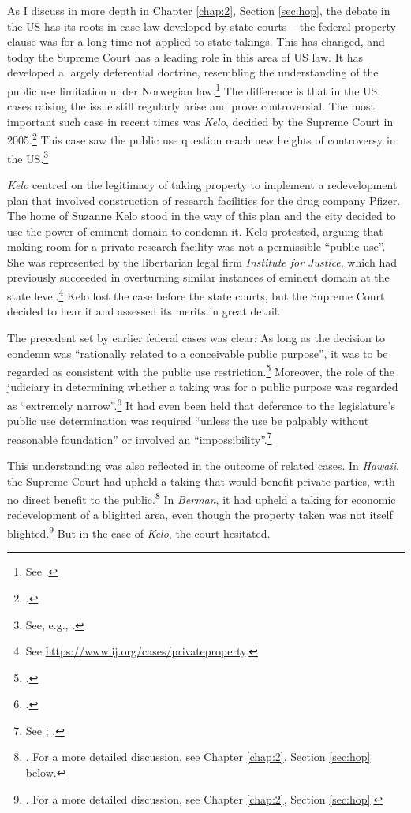 As I discuss in more depth in Chapter \ref{chap:2}, Section \ref{sec:hop}, the debate in the US has its roots in case law developed by state courts -- the federal property clause was for a long time not applied to state takings. This has changed, and today the Supreme Court has a leading role in this area of US law. It has developed a largely deferential doctrine, resembling the understanding of the public use limitation under Norwegian law.\footnote{See \cite{berman54,midkiff84,kelo05}.} The difference is that in the US, cases raising the issue still regularly arise and prove controversial. The most important such case in recent times was {\it Kelo}, decided by the Supreme Court in 2005.\footcite{kelo05} This case saw the public use question reach new heights of controversy in the US.\footnote{See, e.g., \cite{somin09}.}

{\it Kelo} centred on the legitimacy of taking property to implement a redevelopment plan that involved construction of research facilities for the drug company Pfizer. The home of Suzanne Kelo stood in the way of this plan and the city decided to use the power of eminent domain to condemn it. Kelo protested, arguing that making room for a private research facility was not a permissible ``public use''. She was represented by the libertarian legal firm {\it Institute for Justice}, which had previously succeeded in overturning similar instances of eminent domain at the state level.\footnote{See \url{https://www.ij.org/cases/privateproperty}.} Kelo lost the case before the state courts, but the Supreme Court decided to hear it and assessed its merits in great detail.

The precedent set by earlier federal cases was clear: As long as the decision to condemn was ``rationally related to a conceivable public purpose'', it was to be regarded as consistent with the public use restriction.\footcite[241]{midkiff84} Moreover, the role of the judiciary in determining whether a taking was for a public purpose was regarded as ``extremely narrow''.\footcite[32]{berman54} It had even been held that deference to the legislature's public use determination was required ``unless the use be palpably without reasonable foundation'' or involved an ``impossibility''.\footnote{See \cite[66]{dominion25}; \cite[680]{gettysburg96}.}

This understanding was also reflected in the outcome of related cases. In {\it Hawaii}, the Supreme Court had upheld a taking that would benefit private parties, with no direct benefit to the public.\footnote{\cite{midkiff84}. For a more detailed discussion, see Chapter \ref{chap:2}, Section \ref{sec:hop} below.} In {\it Berman}, it had upheld a taking for economic redevelopment of a blighted area, even though the property taken was not itself blighted.\footnote{\cite{berman54}. For a more detailed discussion, see Chapter \ref{chap:2}, Section \ref{sec:hop}.} But in the case of {\it Kelo}, the court hesitated.

